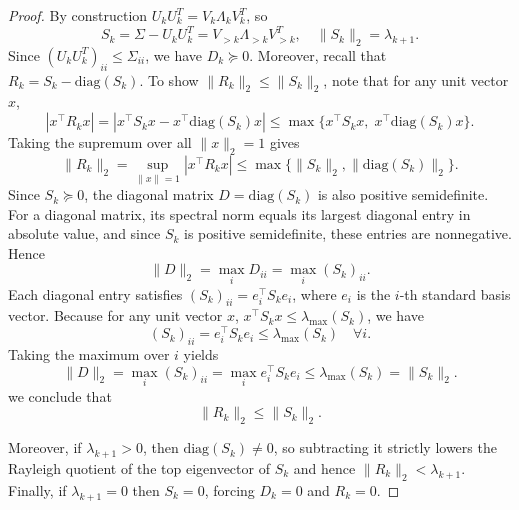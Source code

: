 \documentclass[final,hidelinks,onefignum,onetabnum]{siamart250211}
\providecommand{\diag}{\mathrm{diag}}
\providecommand{\1}{\mathbf{1}}
\theoremstyle{plain}
\begin{document}
\begin{proof}
By construction \(U_kU_k^T=V_k\Lambda_kV_k^T\), so 
\[
S_k=\Sigma-U_kU_k^T=V_{>k}\Lambda_{>k}V_{>k}^T,\quad
\|S_k\|_2=\lambda_{k+1}.
\]
Since \((U_kU_k^T)_{ii}\le\Sigma_{ii}\), we have \(D_k\succeq0\).  
Moreover, recall that \(R_k = S_k - \diag(S_k)\).  
To show \(\|R_k\|_2 \le \|S_k\|_2\), note that for any unit vector \(x\),
\[
|x^\top R_k x| = |x^\top S_k x - x^\top \diag(S_k) x|
  \le \max\{x^\top S_k x,\; x^\top \diag(S_k) x\}.
\]
Taking the supremum over all \(\|x\|_2=1\) gives
\[
\|R_k\|_2 = \sup_{\|x\|=1} |x^\top R_k x|
   \le \max\{\|S_k\|_2,\|\diag(S_k)\|_2\}.
\]
Since \(S_k \succeq 0\), the diagonal matrix \(D = \diag(S_k)\) is also positive semidefinite.  
For a diagonal matrix, its spectral norm equals its largest diagonal entry in absolute value, and since \(S_k\) is positive semidefinite, these entries are nonnegative. Hence
\[
\|D\|_2 = \max_i D_{ii} = \max_i (S_k)_{ii}.
\]
Each diagonal entry satisfies \((S_k)_{ii} = e_i^\top S_k e_i\), where \(e_i\) is the \(i\)-th standard basis vector.  
Because for any unit vector \(x\), \(x^\top S_k x \le \lambda_{\max}(S_k)\), we have
\[
(S_k)_{ii} = e_i^\top S_k e_i \le \lambda_{\max}(S_k) \quad \forall i.
\]
Taking the maximum over \(i\) yields
\[
\|D\|_2 = \max_i (S_k)_{ii} = \max_i e_i^\top S_k e_i \le \lambda_{\max}(S_k) = \|S_k\|_2.
\]
we conclude that
\[
\|R_k\|_2 \le \|S_k\|_2.
\]

Moreover, if \(\lambda_{k+1}>0\), then \(\diag(S_k)\neq0\), so subtracting it strictly lowers the Rayleigh quotient of the top eigenvector of \(S_k\) and hence \(\|R_k\|_2<\lambda_{k+1}\).  Finally, if \(\lambda_{k+1}=0\) then \(S_k=0\), forcing \(D_k=0\) and \(R_k=0\).
\end{proof}
\end{document}
